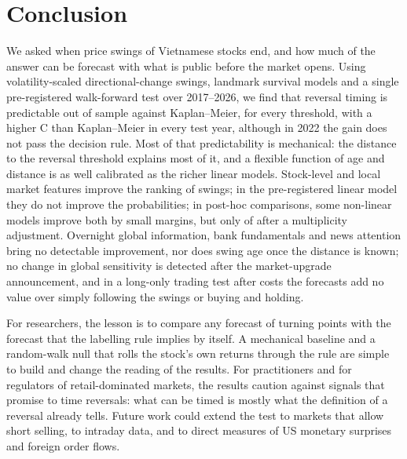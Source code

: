 \section{Conclusion}\label{sec:conclusion}

We asked when price swings of Vietnamese stocks end, and how much of the answer can be forecast
with what is public before the market opens. Using volatility-scaled directional-change swings,
landmark survival models and a single pre-registered walk-forward test over 2017--2026, we find
that reversal timing is predictable out of sample against Kaplan--Meier, for every threshold, with
a higher C than Kaplan--Meier in every test year, although in 2022 the gain does not pass the
decision rule. Most of that predictability is mechanical: the distance to the reversal threshold
explains most of it, and a flexible function of age and distance is as well calibrated as the
richer linear models. Stock-level and local market features improve the ranking of swings; in the
pre-registered linear model they do not improve the probabilities; in post-hoc comparisons, some
non-linear models improve both by small margins, but only \PHHolmPass{} of \PHLikeCount{} after a
multiplicity adjustment. Overnight global information, bank fundamentals
and news attention bring no detectable improvement, nor does swing age once the distance is known; no
change in global sensitivity is detected after the
market-upgrade announcement, and in a long-only trading test after costs the forecasts add no
value over simply following the swings or buying and holding.

For researchers, the lesson is to compare any forecast of turning points with the forecast that the
labelling rule implies by itself. A mechanical baseline and a random-walk null that rolls the
stock's own returns through the rule are simple to build and change the reading of the results. For
practitioners and for regulators of retail-dominated markets, the results caution against signals
that promise to time reversals: what can be timed is mostly what the definition of a reversal
already tells. Future work could extend the test to markets that allow short selling, to intraday
data, and to direct measures of US monetary surprises and foreign order flows.
